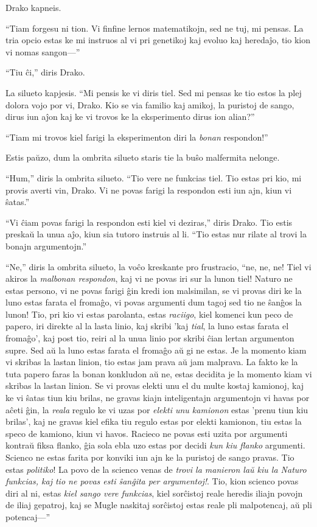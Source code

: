 Drako kapneis.

``Tiam forgesu ni tion. Vi finfine lernos matematikojn, sed ne tuj, mi
pensas. La tria opcio estas ke mi instruos al vi pri genetikoj kaj
evoluo kaj heredaĵo, tio kion vi nomas sangon—''

``Tiu ĉi,'' diris Drako.

La silueto kapjesis. ``Mi pensis ke vi diris tiel. Sed mi pensas ke
tio estos la plej dolora vojo por vi, Drako. Kio se via familio kaj
amikoj, la puristoj de sango, dirus iun aĵon kaj ke vi trovos ke la
eksperimento dirus ion alian?''

``Tiam mi trovos kiel farigi la eksperimenton diri la \emph{bonan}
respondon!''

Estis paŭzo, dum la ombrita silueto staris tie la buŝo malfermita
nelonge.

``Hum,'' diris la ombrita silueto. ``Tio vere ne funkcias tiel. Tio
estas pri kio, mi provis averti vin, Drako. Vi ne povas farigi la
respondon esti iun ajn, kiun vi ŝatas.''

``Vi ĉiam povas farigi la respondon esti kiel vi deziras,'' diris
Drako. Tio estis preskaŭ la unua aĵo, kiun sia tutoro instruis al
li. ``Tio estas nur rilate al trovi la bonajn argumentojn.''

``Ne,'' diris la ombrita silueto, la voĉo kreskante pro frustracio,
``ne, ne, ne! Tiel vi akiros la \emph{malbonan respondon}, kaj vi ne
povas iri sur la lunon tiel! Naturo ne estas persono, vi ne povas
farigi ĝin kredi ion malsimilan, se vi provas diri ke la luno estas
farata el fromaĝo, vi povas argumenti dum tagoj sed tio ne ŝanĝos la
lunon! Tio, pri kio vi estas parolanta, estas \emph{raciigo}, kiel
komenci kun peco de papero, iri direkte al la lasta linio, kaj skribi
'kaj \emph{tial}, la luno estas farata el fromaĝo', kaj post tio,
reiri al la unua linio por skribi ĉian lertan argumenton supre. Sed aŭ
la luno estas farata el fromaĝo aŭ gi ne estas. Je la momento kiam vi
skribas la lastan linion, tio estas jam prava aŭ jam malprava. La
fakto ke la tuta papero faras la bonan konkludon aŭ ne, estas decidita
je la momento kiam vi skribas la lastan linion. Se vi provas elekti
unu el du multe kostaj kamionoj, kaj ke vi ŝatas tiun kiu brilas, ne
gravas kiajn inteligentajn argumentojn vi havas por aĉeti ĝin, la
\emph{reala} regulo ke vi uzas por \emph{elekti unu kamionon} estas
'prenu tiun kiu brilas', kaj ne gravas kiel efika tiu regulo estas por
elekti kamionon, tiu estas la speco de kamiono, kiun vi havos. Racieco
ne povas esti uzita por argumenti kontraŭ fiksa flanko, ĝia sola ebla
uzo estas por decidi \emph{kun kiu flanko} argumenti. Scienco ne estas
farita por konviki iun ajn ke la puristoj de sango pravas. Tio estas
\emph{politiko}! La povo de la scienco venas de \emph{trovi la
manieron laŭ kiu la Naturo funkcias, kaj tio ne povas esti ŝanĝita per
argumentoj!}. Tio, kion scienco povas diri al ni, estas \emph{kiel
sango vere funkcias}, kiel sorĉistoj reale heredis iliajn povojn de
iliaj gepatroj, kaj se Mugle naskitaj sorĉistoj estas reale pli
malpotencaj, aŭ pli potencaj—''


